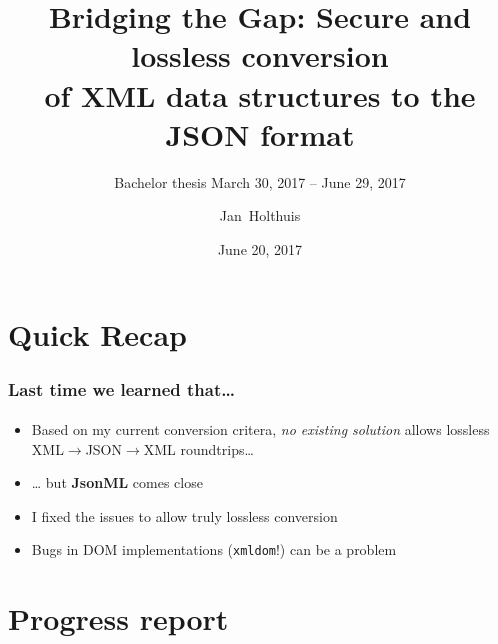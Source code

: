 \documentclass[
    alternativetitlepage=alternativ,
    cornerlogo=hgi_nds_logo2,
    sectionoverview,
]{rubpresentation}
\title[XML/JSON conversions]
{Bridging the Gap: Secure and lossless conversion\\ of XML data structures to the JSON format}
\subtitle{\small Bachelor thesis \hspace{3mm}{\scriptsize $\blacksquare$}\hspace{3mm} March 30, 2017 -- June 29, 2017}
\author[Holthuis]{Jan~Holthuis}
\institute[Advisors]
{%
Advisors: Dennis Felsch \& Paul Rösler
}
\date{June 20, 2017}
\begin{document}
\frame[plain]{\titlepage}




\section{Quick Recap}

\begin{frame}
    \frametitle{Last time we learned that\dots{}}
    \framesubtitle{}
    \begin{itemize}
        \item{} Based on my current conversion critera, \emph{no existing solution} allows lossless XML$\rightarrow$JSON$\rightarrow$XML roundtrips\dots{}
        \item{} \dots{} but \textbf{JsonML} comes close
        \item{} I fixed the issues to allow truly lossless conversion
        \item{} Bugs in DOM implementations (\texttt{xmldom}!) can be a problem
    \end{itemize}
\end{frame}

\section{Progress report}
\end{document}
